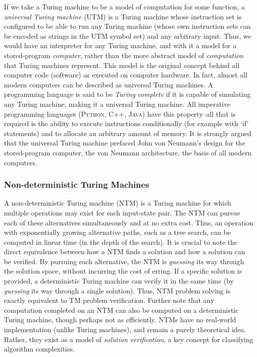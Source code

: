 \documentclass[11pt]{amsart}
\begin{document}
If we take a Turing machine to be a model of computation for some function, a \emph{universal Turing machine} (UTM) is a Turing machine whose instruction set is configured to be able to run any Turing machine (whose own instruction sets can be encoded as strings in the UTM symbol set) and any arbitrary input. Thus, we would have an interpreter for any Turing machine, and with it a model for a stored-program \emph{computer}, rather than the more abstract model of \emph{computation} that Turing machines represent. This model is the original concept behind all computer code (software) as executed on computer hardware. In fact, almost all modern computers can be described as universal Turing machines. A programming language is said to be \emph{Turing complete} if it is capable of simulating any Turing machine, making it a universal Turing machine. All imperative programming languages (\textsc{Python}, C++, \textsc{Java}) have this property--all that is required is the ability to execute instructions conditionally (for example with `if' statements) and to allocate an arbitrary amount of memory. It is strongly argued that the universal Turing machine prefaced John von Neumann's design for the stored-program computer, the von Neumann architecture, the basis of all modern computers.

\subsubsection{Non-deterministic Turing Machines}

A non-deterministic Turing machine (NTM) is a Turing machine for which multiple operations may exist for each input-state pair. The NTM can pursue each of these alternatives simultaneously and at no extra cost. Thus, an operation with exponentially growing alternative paths, such as a tree search, can be computed in linear time (in the depth of the search). It is crucial to note the direct equivalence between how a NTM finds a solution and how a solution can be verified. By pursuing each alternative, the NTM is \emph{guessing} its way through the solution space, without incurring the cost of erring. If a specific solution is provided, a deterministic Turing machine can verify it in the same time (by \emph{guessing} its way through a single solution). Thus, NTM problem solving is exactly equivalent to TM problem verification. Further note that any computation completed on an NTM can also be computed on a deterministic Turing machine, though perhaps not as efficiently. NTMs have no real-world implementation (unlike Turing machines), and remain a purely theoretical idea. Rather, they exist as a model of \emph{solution verification}, a key concept for classifying algorithm complexities.
\end{document}
